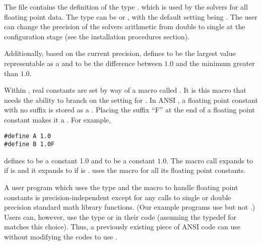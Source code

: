 %
The  file contains the definition of the type .
which is used by the {\sundials} solvers for all floating point data.
The type  can be  or , with the default setting 
being .
The user can change the precision of the {\sundials} solvers arithmetic from double 
to single at the configuration stage (see the {\sundials} installation procedures section).

Additionally, based on the current precision,  defines 
 to be the largest value representable as a  and
 to be the difference between $1.0$ and the minimum 
greater than $1.0$.

Within {\sundials}, real constants are set by way of a macro called
.  It is this macro that needs the ability to branch on the
setting for .  In ANSI {\C}, a floating point constant with no
suffix is stored as a .  Placing the suffix ``F'' at the
end of a floating point constant makes it a . For example,
\begin{verbatim}
#define A 1.0
#define B 1.0F
\end{verbatim}
defines  to be a  constant 1.0 and  to be a
 constant $1.0$. The macro call 
expands to  if  is  and it expands to
 if  is . {\sundials} uses the  macro for
all its floating point constants. 

A user program which uses the type  and the  macro
to handle floating point constants is precision-independent except for
any calls to single or double precision standard math library
functions.  (Our example programs use  but not
.)  Users can, however, use the type  or
 in their code (assuming the typedef for  matches
this choice).  Thus, a previously existing piece of ANSI {\C} code can use
{\sundials} without modifying the codes to use .
